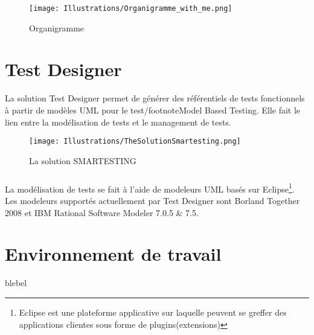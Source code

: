 \begin{figure}[!h]
\centering
\texttt{[image: Illustrations/Organigramme\_with\_me.png]}
\caption{Organigramme}
\label{fig:Organigramme de Smartesting}
\end{figure}

\section{Test Designer}
La solution Test Designer permet de générer des référentiels de tests fonctionnels à partir de modèles UML pour le test/footnote{Model Based Testing}. Elle fait le lien entre la modélisation de tests et le management de tests.

\begin{figure}[!h]
\centering
\texttt{[image: Illustrations/TheSolutionSmartesting.png]}
\caption{La solution SMARTESTING}
\label{fig: La Solution SMARTESTING}
\end{figure}



\subparagraph*{}
La modélisation de tests se fait à l'aide de modeleurs UML basés sur Eclipse\footnote{Eclipse est une plateforme applicative sur laquelle peuvent se greffer des applications clientes sous forme de plugins(extensions)}. Les modeleurs supportés actuellement par Test Designer sont Borland Together 2008 et IBM Rational Software Modeler 7.0.5 \& 7.5. 




\section{Environnement de travail}
blebel


